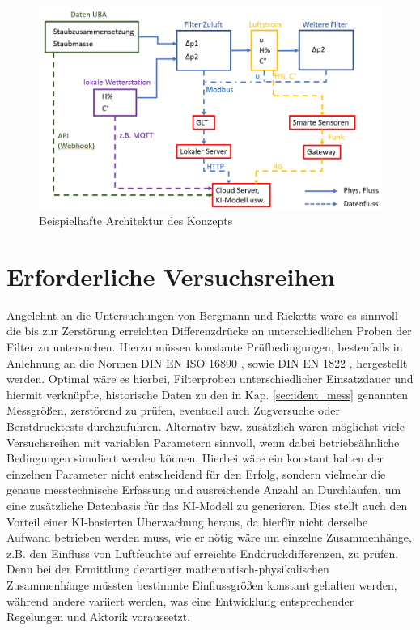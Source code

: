     \begin{figure}[H]
        \begin{center}
            \includegraphics[width=\linewidth]{images/architektur.png}
            \caption[Architektur des Konzepts]{Beispielhafte Architektur des Konzepts}
            \label{fi:architektur}
        \end{center}
    \end{figure} 
    \section{Erforderliche Versuchsreihen}
    \label{sec:versuchsreihen}
    Angelehnt an die Untersuchungen von Bergmann \cite{hepa} und Ricketts \cite{feuchte} wäre es sinnvoll die bis zur Zerstörung erreichten Differenzdrücke an unterschiedlichen Proben der Filter zu untersuchen. Hierzu müssen konstante Prüfbedingungen, bestenfalls in Anlehnung an die Normen DIN EN ISO 16890 \cite{16890}, sowie DIN EN 1822 \cite{1822}, hergestellt werden.
    Optimal wäre es hierbei, Filterproben unterschiedlicher Einsatzdauer und hiermit verknüpfte, historische Daten zu den in Kap. \ref{sec:ident_mess} genannten Messgrößen, zerstörend zu prüfen, eventuell auch Zugversuche oder Berstdrucktests durchzuführen. Alternativ bzw. zusätzlich wären möglichst viele Versuchsreihen mit variablen Parametern sinnvoll, wenn dabei betriebsähnliche Bedingungen simuliert werden können. Hierbei wäre ein konstant halten der einzelnen Parameter nicht entscheidend für den Erfolg, sondern vielmehr die genaue messtechnische Erfassung und ausreichende Anzahl an Durchläufen, um eine zusätzliche Datenbasis für das KI-Modell zu generieren. Dies stellt auch den Vorteil einer KI-basierten Überwachung heraus, da hierfür nicht derselbe Aufwand betrieben werden muss, wie er nötig wäre um einzelne Zusammenhänge, z.B. den Einfluss von Luftfeuchte auf erreichte Enddruckdifferenzen, zu prüfen. Denn bei der Ermittlung derartiger mathematisch-physikalischen Zusammenhänge müssten bestimmte Einflussgrößen konstant gehalten werden, während andere variiert werden, was eine Entwicklung entsprechender Regelungen und Aktorik voraussetzt.
